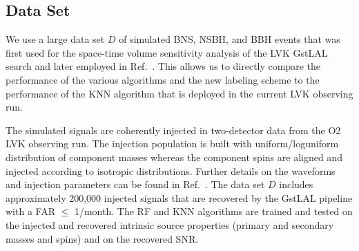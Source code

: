 \subsection{Data Set} \label{dataset}

We use a large data set $D$ of simulated \ac{BNS}, \ac{NSBH}, and \ac{BBH} events that was first used for the space-time volume sensitivity analysis of the \ac{LVK} GstLAL search
and later employed in Ref.~\cite{Chatterjee:2019avs}. This allows us to directly compare the performance of the various algorithms and the new labeling
scheme to the performance of the \ac{KNN} algorithm that is deployed in the current \ac{LVK} observing run. 

The simulated signals are coherently injected in two-detector data from the \ac{O2} \ac{LVK} observing run. The injection population is built with uniform/loguniform distribution of component masses whereas the component spins are aligned and injected according to isotropic distributions. Further details on the waveforms and injection parameters can be found in Ref.~\cite{Chatterjee:2019avs}. The data set $D$ includes approximately 200,000 injected signals that are recovered by the GstLAL pipeline with a \ac{FAR} $\le$ 1/month. The \ac{RF} and \ac{KNN} algorithms are trained and tested on the injected and recovered intrinsic source properties (primary and secondary masses and spins) and on the recovered \ac{SNR}. 


